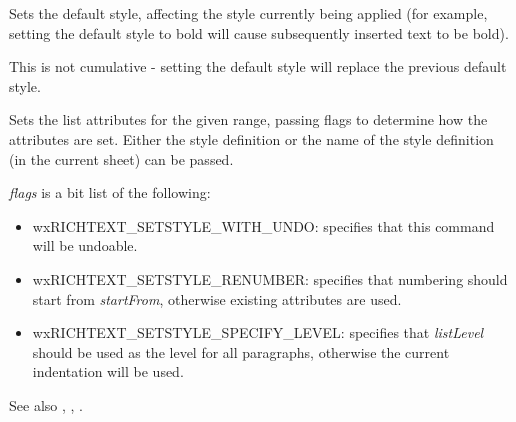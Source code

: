 
Sets the default style, affecting the style currently being applied (for example, setting the default
style to bold will cause subsequently inserted text to be bold).

This is not cumulative - setting the default style will replace the previous default style.

\label{wxrichtextbuffersetliststyle}



Sets the list attributes for the given range, passing flags to determine how the attributes are set.
Either the style definition or the name of the style definition (in the current sheet) can be passed.

{\it flags} is a bit list of the following:

\begin{itemize}\itemsep=0pt
\item wxRICHTEXT\_SETSTYLE\_WITH\_UNDO: specifies that this command will be undoable.
\item wxRICHTEXT\_SETSTYLE\_RENUMBER: specifies that numbering should start from {\it startFrom}, otherwise existing attributes are used.
\item wxRICHTEXT\_SETSTYLE\_SPECIFY\_LEVEL: specifies that {\it listLevel} should be used as the level for all paragraphs, otherwise the current indentation will be used.
\end{itemize}

See also , , .

\label{wxrichtextbuffersetrenderer}


